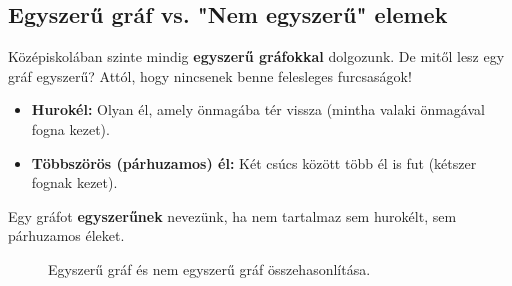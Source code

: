 \documentclass[a4paper,12pt]{article}
\theoremstyle{definition} %
\begin{document}
\subsection{Egyszerű gráf vs. "Nem egyszerű" elemek}

Középiskolában szinte mindig \textbf{egyszerű gráfokkal} dolgozunk. De mitől lesz egy gráf egyszerű? Attól, hogy nincsenek benne felesleges furcsaságok!
\begin{itemize}
    \item \textbf{Hurokél:} Olyan él, amely önmagába tér vissza (mintha valaki önmagával fogna kezet).
    \item \textbf{Többszörös (párhuzamos) él:} Két csúcs között több él is fut (kétszer fognak kezet).
\end{itemize}

\begin{definiciodoboz}
Egy gráfot \textbf{egyszerűnek} nevezünk, ha nem tartalmaz sem hurokélt, sem párhuzamos éleket.
\end{definiciodoboz}

\begin{figure}[H]
    \centering
    \caption{Egyszerű gráf és nem egyszerű gráf összehasonlítása.}
    \label{fig:simple_graph}
\end{figure}
\end{document}
